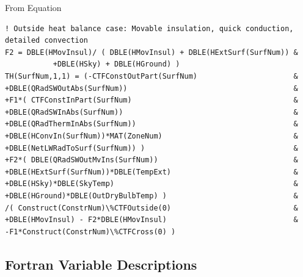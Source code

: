 From Equation

\begin{lstlisting}
! Outside heat balance case: Movable insulation, quick conduction, detailed convection
F2 = DBLE(HMovInsul)/ ( DBLE(HMovInsul) + DBLE(HExtSurf(SurfNum)) &
           +DBLE(HSky) + DBLE(HGround) )
TH(SurfNum,1,1) = (-CTFConstOutPart(SurfNum)                      &
+DBLE(QRadSWOutAbs(SurfNum))                                      &
+F1*( CTFConstInPart(SurfNum)                                     &
+DBLE(QRadSWInAbs(SurfNum))                                       &
+DBLE(QRadThermInAbs(SurfNum))                                    &
+DBLE(HConvIn(SurfNum))*MAT(ZoneNum)                              &
+DBLE(NetLWRadToSurf(SurfNum)) )                                  &
+F2*( DBLE(QRadSWOutMvIns(SurfNum))                               &
+DBLE(HExtSurf(SurfNum))*DBLE(TempExt)                            &
+DBLE(HSky)*DBLE(SkyTemp)                                         &
+DBLE(HGround)*DBLE(OutDryBulbTemp) )                             &
/( Construct(ConstrNum)\%CTFOutside(0)                            &
+DBLE(HMovInsul) - F2*DBLE(HMovInsul)                             &
-F1*Construct(ConstrNum)\%CTFCross(0) )
\end{lstlisting}

\subsection{Fortran Variable Descriptions}\label{fortran-variable-descriptions}

